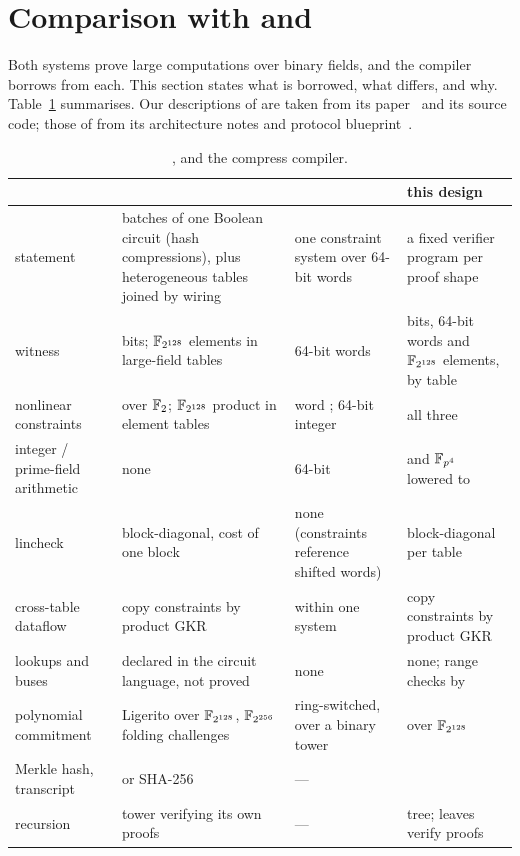 \section{Comparison with \Flock{} and \Binius{}}\label{sec:comparison}

Both systems prove large computations over binary fields, and the compiler borrows from each. This section states what is borrowed, what differs, and why. Table~\ref{tab:comparison} summarises. Our descriptions of \Flock{} are taken from its paper~\citep{flock} and its source code; those of \Binius{} from its architecture notes and protocol blueprint~\citep{binius64}.

\begin{table}[t]
\centering\small
\caption{\Flock{}, \Binius{} and the compress compiler.}
\label{tab:comparison}
\begin{tabularx}{\linewidth}{>{\raggedright\arraybackslash}p{2.6cm}XXX}
\toprule
 & \Flock{} & \Binius{} & this design \\
\midrule
statement & batches of one Boolean circuit (hash compressions), plus heterogeneous tables joined by wiring & one constraint system over 64-bit words & a fixed verifier program per proof shape \\
witness & bits; $\mathbb{F}_{2^{128}}$ elements in large-field tables & 64-bit words & bits, 64-bit words and $\mathbb{F}_{2^{128}}$ elements, by table \\
nonlinear constraints & \AND{} over $\mathbb{F}_{2}$; $\mathbb{F}_{2^{128}}$ product in element tables & word \AND{}; 64-bit integer \MUL{} & all three \\
integer / prime-field arithmetic & none & 64-bit \MUL{} & \KB{} and $\mathbb{F}_{p^4}$ lowered to \MUL{} \\
lincheck & block-diagonal, cost of one block & none (constraints reference shifted words) & block-diagonal per table \\
cross-table dataflow & copy constraints by product GKR & within one system & copy constraints by product GKR \\
lookups and buses & declared in the circuit language, not proved & none & none; range checks by \AND{} \\
polynomial commitment & Ligerito over $\mathbb{F}_{2^{128}}$, $\mathbb{F}_{2^{256}}$ folding challenges & ring-switched, over a binary tower & \WHIR{} over $\mathbb{F}_{2^{128}}$ \\
Merkle hash, transcript & \Blake{} or SHA-256 & --- & \Blake{} \\
recursion & tower verifying its own proofs & --- & tree; leaves verify \KB{} proofs \\
\bottomrule
\end{tabularx}
\end{table}

